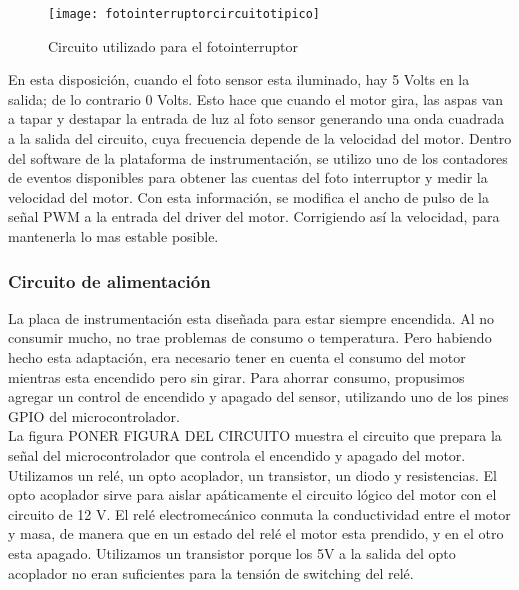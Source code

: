 \begin{figure}[h]
  \centering
  \texttt{[image: fotointerruptorcircuitotipico]}
  \caption{Circuito utilizado para el fotointerruptor}\label{fig:fotointerruptorcircuitotipico}
\end{figure}

En esta disposición, cuando el foto sensor esta iluminado, hay 5 Volts en la salida; de lo contrario 0 Volts. Esto hace que cuando el motor gira, las aspas van a tapar y destapar la entrada de luz al foto sensor generando una onda cuadrada a la salida del circuito, cuya frecuencia depende de la velocidad del motor. Dentro del software de la plataforma de instrumentación, se utilizo uno de los contadores de eventos disponibles para obtener las cuentas del foto interruptor y medir la velocidad del motor. Con esta información, se modifica el ancho de pulso de la señal PWM a la entrada del driver del motor. Corrigiendo así la velocidad, para mantenerla lo mas estable posible. 


\subsubsection{Circuito de alimentación} %
\label{it6:ssub:circuito_de_alimentacion}

La placa de instrumentación esta diseñada para estar siempre encendida. Al no consumir mucho, no trae problemas de consumo o temperatura. Pero habiendo hecho esta adaptación, era necesario tener en cuenta el consumo del motor mientras esta encendido pero sin girar. Para ahorrar consumo, propusimos agregar un control de encendido y apagado del sensor, utilizando uno de los pines GPIO del microcontrolador. \\

La figura PONER FIGURA DEL CIRCUITO muestra el circuito que prepara la señal del microcontrolador que controla el encendido y apagado del motor. Utilizamos un relé, un opto acoplador, un transistor, un diodo y resistencias. El opto acoplador sirve para aislar apáticamente el circuito lógico del motor con el circuito de 12 V. El relé electromecánico conmuta la conductividad entre el motor y masa, de manera que en un estado del relé el motor esta prendido, y en el otro esta apagado. Utilizamos un transistor porque los 5V a la salida del opto acoplador no eran suficientes para la tensión de switching del relé.


